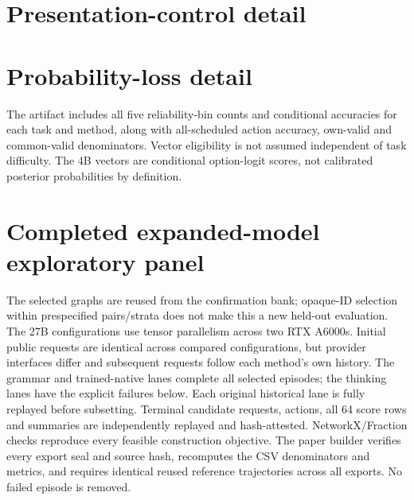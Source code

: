 \documentclass[11pt]{article}
\begin{document}
\section{Presentation-control detail}
\begin{table}[ht]
\centering\scriptsize
\resizebox{\textwidth}{!}{}
\caption{Correct cases / scheduled cases in each arm. Counts are not
independent across arms or paired queries. An unchanged aggregate accuracy
does not imply unchanged semantic choices.}
\end{table}
\begin{table}[ht]
\centering\scriptsize

\caption{Choice flips relative to the original arm / both-valid pairs.
There are no invalid actions in this completed panel. Edge counts include the
two retained unchanged inputs; their separate strata are in the artifact.}
\end{table}

\section{Probability-loss detail}
\begin{table}[ht]
\centering\small

\caption{Logarithmic loss on the common-valid rows from
Table~\ref{tab:brier}, in natural-log units. A positive-infinity entry means at
least one true label received exactly zero probability, not a missing value.
Finite-only averaging is not substituted for an infinite loss.}
\end{table}
The artifact includes all five reliability-bin counts and conditional
accuracies for each task and method, along with all-scheduled action accuracy,
own-valid and common-valid denominators. Vector eligibility is not assumed
independent of task difficulty. The 4B vectors are conditional option-logit
scores, not calibrated posterior probabilities by definition.

\section{Completed expanded-model exploratory panel}
\label{app:larger-local}
The selected graphs are reused from the confirmation bank; opaque-ID selection
within prespecified pairs/strata does not make this a new held-out evaluation.
The 27B configurations use tensor parallelism across two RTX A6000s.
Initial public requests are identical across compared configurations, but
provider interfaces differ and subsequent requests follow each method's own
history. The grammar and trained-native lanes complete all selected episodes;
the thinking lanes have the explicit failures below. Each original historical
lane is fully replayed before subsetting. Terminal candidate requests, actions,
all 64 score rows and summaries are independently replayed and hash-attested.
NetworkX/Fraction checks reproduce every feasible construction objective.
The paper builder verifies every export seal and source hash, recomputes the
CSV denominators and metrics, and requires identical reused reference
trajectories across all exports. No failed episode is removed.
\end{document}

